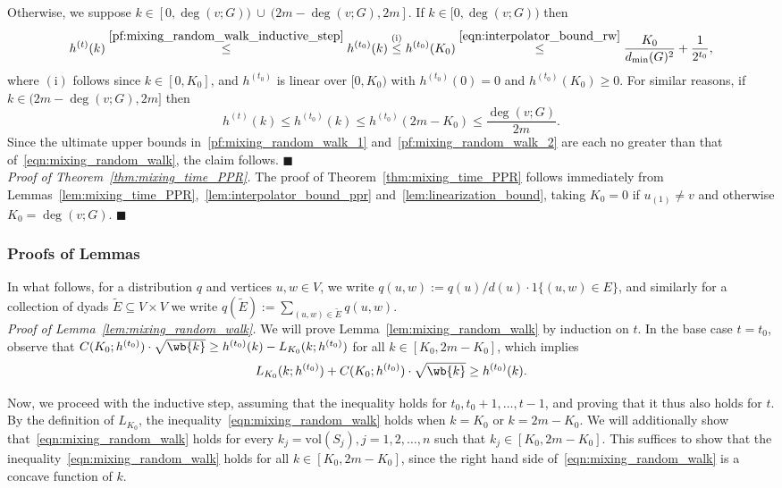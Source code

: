 \documentclass[twoside,11pt]{article}
\newcommand{\1}{\mathbf{1}}
\newcommand{\wt}[1]{\widetilde{#1}}
\newcommand{\vol}{\mathrm{vol}}
\newcommand{\qed}{\hfill $\blacksquare$}
\begin{document}
Otherwise, we suppose $k \in [0, \deg(v;G)) ~\cup~ (2m - \deg(v;G),2m]$. If $k \in [0, \deg(v;G))$ then
\begin{equation}
\label{pf:mixing_random_walk_1}
h^{(t)}(k) \overset{\eqref{pf:mixing_random_walk_inductive_step}}{\leq} h^{(t_0)}(k) \overset{(\textrm{i})}{\leq} h^{(t_0)}(K_0) \overset{\eqref{eqn:interpolator_bound_rw}}{\leq} \frac{K_0}{d_{\min}(G)^2} + \frac{1}{2^{t_0}},
\end{equation}
where $(\textrm{i})$ follows since $k \in [0,K_0]$, and $h^{(t_0)}$ is linear over $[0,K_0)$ with $h^{(t_0)}(0) = 0$ and $h^{(t_0)}(K_0) \geq 0$. For similar reasons, if $k \in (2m - \deg(v;G),2m]$ then
\begin{equation}
\label{pf:mixing_random_walk_2}
h^{(t)}(k) \leq h^{(t_0)}(k) \leq h^{(t_0)}(2m - K_0) \leq \frac{\deg(v;G)}{2m}.
\end{equation}
Since the ultimate upper bounds in~\eqref{pf:mixing_random_walk_1} and~\eqref{pf:mixing_random_walk_2} are each no greater than that of~\eqref{eqn:mixing_random_walk}, the claim follows. \qed \\

\noindent \emph{Proof of Theorem~\ref{thm:mixing_time_PPR}.}
The proof of Theorem~\ref{thm:mixing_time_PPR} follows immediately from Lemmas~\ref{lem:mixing_time_PPR},~\ref{lem:interpolator_bound_ppr} and~\ref{lem:linearization_bound}, taking $K_0 = 0$ if $u_{(1)} \neq v$ and otherwise $K_0 = \deg(v;G)$. \qed

\subsubsection{Proofs of Lemmas}
In what follows, for a distribution $q$ and vertices $u,w \in V$, we write $q(u,w) := q(u)/d(u) \cdot 1\{(u,w) \in E\}$, and similarly for a collection of dyads $\wt{E} \subseteq V \times V$ we write $q(\wt{E}) := \sum_{(u,w) \in \wt{E}} q(u,w)$. \\

\noindent\emph{Proof of Lemma~\ref{lem:mixing_random_walk}.}
We will prove Lemma~\ref{lem:mixing_random_walk} by induction on $t$. In the base case $t = t_0$, observe that $C(K_0;h^{(t_0)}) \cdot \sqrt{\wb{k}} \geq h^{(t_0)}(k) - L_{K_0}(k;h^{(t_0)})$ for all $k \in [K_0, 2m - K_0]$, which implies 
\begin{equation*}
L_{K_0}(k;h^{(t_0)}) + C(K_0; h^{(t_0)}) \cdot \sqrt{\wb{k}} \geq h^{(t_0)}(k).
\end{equation*}

Now, we proceed with the inductive step, assuming that the inequality holds for $t_0,t_0 + 1,\ldots,t - 1$, and proving that it thus also holds for $t$. By the definition of $L_{K_0}$, the inequality~\eqref{eqn:mixing_random_walk} holds when $k = K_0$ or $k = 2m - K_0$. We will additionally show that~\eqref{eqn:mixing_random_walk} holds for every $k_j = \vol(S_j), j = 1,2,\ldots,n$ such that $k_j \in [K_0, 2m - K_0]$. This suffices to show that the inequality~\eqref{eqn:mixing_random_walk} holds for all $k \in [K_0,2m - K_0]$, since the right hand side of~\eqref{eqn:mixing_random_walk} is a concave function of $k$.
\end{document}
